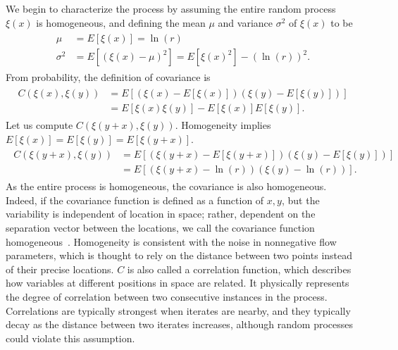 We begin to characterize the process by
assuming the entire random process $\xi(x)$ is homogeneous, and defining the mean $\mu$ and variance $\sigma^2$
of $\xi(x)$ to be
\begin{align}
\begin{split}\label{ximean}
\mu &= E[\xi(x)] = \ln(r)\\
\sigma^2 &= E[(\xi(x) - \mu)^2]=E[\xi(x)^2]-(\ln(r))^2.
\end{split}
\end{align}
From probability, the definition of covariance is~\cite{ross}
\begin{align*}
\begin{split}
C(\xi(x),\xi(y)) &= E[(\xi(x) - E[\xi(x)])(\xi(y) - E[\xi(y)])]\\
&= E[\xi(x)\xi(y)] - E[\xi(x)]E[\xi(y)].
\end{split}
\end{align*}
Let us compute $C(\xi(y+x),\xi(y))$. Homogeneity implies $E[\xi(x)] =
E[\xi(y)] = E[\xi(y+x)]$.
\begin{align}
\begin{split}\label{cor}
C(\xi(y+x),\xi(y)) &= E[(\xi(y+x) - E[\xi(y+x)])(\xi(y) -
E[\xi(y)])]\\
&= E[(\xi(y+x) -\ln(r))(\xi(y)-\ln(r))]. 
\end{split}
\end{align}
As the entire process is homogeneous, the covariance is also
homogeneous. Indeed, if the covariance function is defined as a function of $x,y$, but the
variability is independent of location in space; rather, dependent on
the separation vector between the locations, we call the covariance
function homogeneous~\cite{gelhar}. Homogeneity is consistent with the
noise in nonnegative flow parameters, which is
thought to rely on the distance between two points instead of their
precise locations. $C$ is also called a correlation function, which
describes how variables at different positions in space are
related. It physically represents the degree of correlation between
two consecutive instances in the process. Correlations are typically strongest
when iterates are nearby, and they typically decay as the distance
between two iterates increases, although random processes could violate this assumption. 

